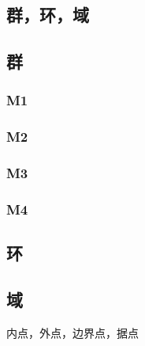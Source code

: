 \begin{center}\section{ 群，环，域}\end{center}
\subsection{群}
\subsubsection{M1}
\subsubsection{M2}
\subsubsection{M3}
\subsubsection{M4}
\subsection{环}
\subsection{域}
内点，外点，边界点，据点